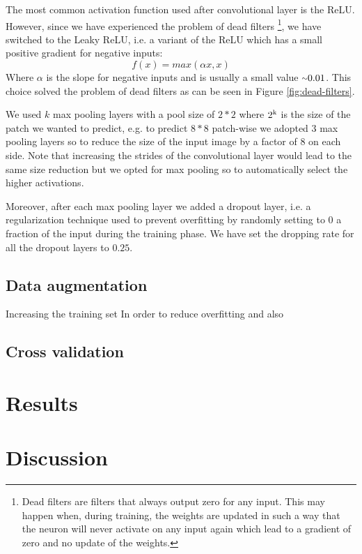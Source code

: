 \documentclass[10pt,conference,compsocconf]{IEEEtran}
\begin{document}
The most common activation function used after convolutional layer is the ReLU. However, since we have experienced the problem of dead filters \footnote{Dead filters are filters that always output zero for any input. This may happen when, during training, the weights are updated in such a way that the neuron will never activate on any input again which lead to a gradient of zero and no update of the weights.}, we have switched to the Leaky ReLU, i.e. a variant of the ReLU which has a small positive gradient for negative inputs: 
$$f(x)=max(\alpha x, x)$$
Where $\alpha$ is the slope for negative inputs and is usually a small value ${\raise.17ex\hbox{$\scriptstyle\sim$}}0.01$.
This choice solved the problem of dead filters as can be seen in Figure \ref{fig:dead-filters}.

We used $k$ max pooling layers with a pool size of $2*2$ where $2\textsuperscript{k}$ is the size of the patch we wanted to predict, e.g. to predict $8*8$ patch-wise we adopted 3 max pooling layers so to reduce the size of the input image by a factor of 8 on each side. Note that increasing the strides of the convolutional layer would lead to the same size reduction but we opted for max pooling so to automatically select the higher activations. 

Moreover, after each max pooling layer we added a dropout layer, i.e. a regularization technique used to prevent overfitting by randomly setting to 0 a fraction of the input during the training phase. We have set the dropping rate for all the dropout layers to $0.25$.

\subsection{Data augmentation}
Increasing the training set In order to reduce overfitting and also

\subsection{Cross validation}

\section{Results}
\label{sec:Results}

\section{Discussion}
\label{sec:Discussion}
\end{document}
